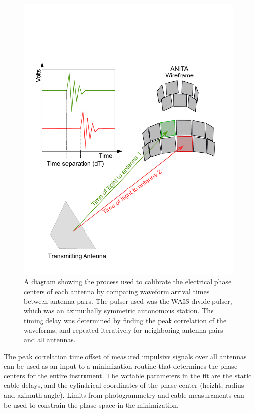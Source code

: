 \begin{figure}
	\label{fig:phaseCenterDiag}
		\centering
		\includegraphics[height=\textheight]{figures/phaseCenterCalib}
		\caption{A diagram showing the process used to calibrate the electrical phase centers of each antenna by comparing waveform arrival times between antenna pairs.  The pulser used was the WAIS divide pulser, which was an azimuthally symmetric autonomous station.  The timing delay was determined by finding the peak correlation of the waveforms, and repeated iteratively for neighboring antenna pairs and all antennas.}
	\end{figure}	
		
	The peak correlation time offset of measured impulsive signals over all antennas can be used as an input to a minimization routine that determines the phase centers for the entire instrument.  The variable parameters in the fit are the static cable delays, and the cylindrical coordinates of the phase center (height, radius and azimuth angle).  Limits from photogrammetry and cable measurements can be used to constrain the phase space in the minimization.
		

